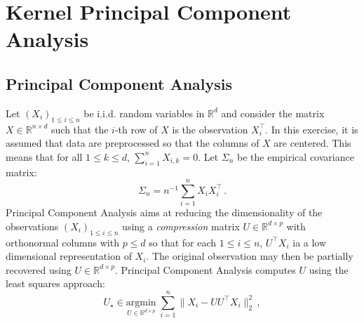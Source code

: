 \documentclass[a4paper,10pt,fleqn]{article}
\newcommand{\eqsp}{\,}
\newcommand{\rset}{\ensuremath{\mathbb{R}}}
\newcommand{\1}{\ensuremath{\mathbbm{1}}}
\newcommand{\bfU}{U}
\newcommand{\bfX}{X}
\newcommand{\bfs}{\Sigma}
\begin{document}
\section*{Kernel Principal Component Analysis}
\subsection*{Principal Component Analysis}
 Let $(X_i)_{1\leqslant i\leqslant n}$ be i.i.d. random variables in $\rset^d$ and consider the matrix $\bfX\in\rset^{n\times d}$ such that the $i$-th row of $\bfX$ is the observation $X^\top_i$. In this exercise, it is assumed that data are preprocessed so that the columns of $\bfX$ are centered.  This means that for all $1\leqslant k \leqslant d$, $\sum_{i=1}^{n}X_{i,k} = 0$. Let $\bfs_n$ be the empirical covariance matrix:
$$
\bfs_n = n^{-1}\sum_{i=1}^n X_i X^\top_i\eqsp.
$$
Principal Component Analysis  aims at reducing the dimensionality of the observations $(X_i)_{1\leqslant i \leqslant n}$ using a {\em compression} matrix $\bfU\in \rset^{d\times p}$ with orthonormal columns with $p\leqslant d$ so that for each $1\leqslant i \leqslant n$, $\bfU^\top X_i$ ia a low dimensional representation of $X_i$. The original observation may then be partially recovered using  $\bfU\in \rset^{d\times p}$. Principal Component Analysis computes $\bfU$ using the least squares approach:
$$
\bfU_{\star} \in \underset{U\in  \rset^{d\times p}}{\mathrm{argmin}} \;\sum_{i=1}^n\|X_i - \bfU\bfU^\top X_i\|_2^2\eqsp,
$$
\end{document}
